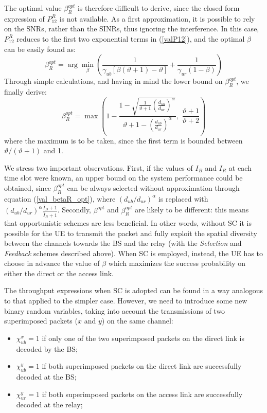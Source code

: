 \documentclass[12pt, letterpaper, onecolumn, draftcls]{IEEEtran}
\begin{document}
The optimal value $\beta_R^{opt}$ is therefore difficult to derive, since the closed form expression of $P_{12}^R$ is not available. As a first approximation, it is possible to rely on the SNRs, rather than the SINRs, thus ignoring the interference. In this case, $P_{12}^R$ reduces to the first two exponential terms in (\ref{valP12}), and the optimal $\beta$ can be easily found as:
\begin{equation}
 \beta_R^{opt} = \arg\min_{\beta}\left(\frac{1}{\gamma_{ub}[\beta(\vartheta+1)-\vartheta]} + \frac{1}{\gamma_{ur}(1-\beta)}\right)
\end{equation}
Through simple calculations, and having in mind the lower bound on $\beta_R^{opt}$, we finally derive:
\begin{equation}
 \beta_R^{opt} = \max\left(1-\frac{1-\sqrt{\frac{1}{\vartheta+1}\left(\frac{d_{ub}}{d_{ur}}\right)^{\alpha}}}{\vartheta+1-\left(\frac{d_{ub}}{d_{ur}}\right)^{\alpha}},\,\, \frac{\vartheta+1}{\vartheta+2}\right)
\label{val_betaR_opt}
\end{equation}
where the maximum is to be taken, since the first term is bounded between $\vartheta/(\vartheta+1)$ and 1.

We stress two important observations. First, if the values of $I_B$ and $I_R$ at each time slot were known, an upper bound on the system performance could be obtained, since $\beta_R^{opt}$ can be always selected without approximation through equation (\ref{val_betaR_opt}), where $\left(d_{ub}/d_{ur}\right)^{\alpha}$ is replaced with $\left(d_{ub}/d_{ur}\right)^{\alpha}\frac{\hat{I}_B+1}{\hat{I}_R+1}$. Secondly, $\beta^{opt}$ and $\beta_R^{opt}$ are likely to be different: this means that opportunistic schemes are less beneficial. In other words, without SC it is possible for the UE to transmit the packet and fully exploit the spatial diversity between the channels towards the BS and the relay (with the \textit{Selection} and \textit{Feedback} schemes described above).
When SC is employed, instead, the UE has to choose in advance the value of $\beta$ which maximizes the success probability on either the direct or the access link.

The throughput expressions when SC is adopted can be found in a way analogous to that applied to the simpler case. However, we need to introduce some new binary random variables, taking into account the transmissions of two superimposed packets ($x$ and $y$) on the same channel:
\begin{itemize}
 \item $\chi_{ub}^x=1$ if only one of the two superimposed packets on the direct link is decoded by the BS;
 \item $\chi_{ub}^y=1$ if both superimposed packets on the direct link are successfully decoded at the BS;
 \item $\chi_{ur}^y=1$ if both superimposed packets on the access link are successfully decoded at the relay;
\end{itemize}
\end{document}
